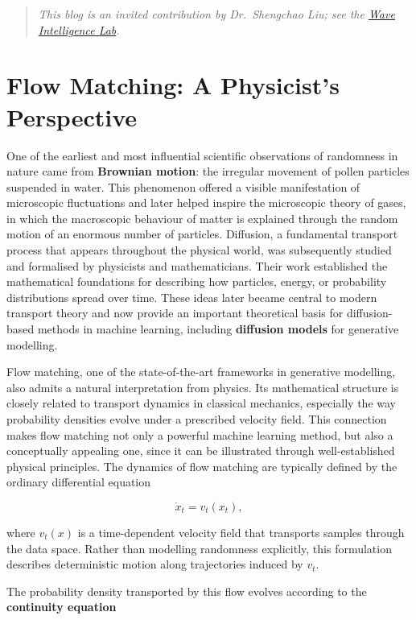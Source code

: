 \begin{quote}\emph{This blog is an invited contribution by Dr.~Shengchao Liu; see the \href{http://waveintell.ai/blog/}{Wave Intelligence Lab}.}\end{quote}

\section{Flow Matching: A Physicist's Perspective}

One of the earliest and most influential scientific observations of randomness in nature came from \textbf{Brownian motion}: the irregular movement of pollen particles suspended in water. This phenomenon offered a visible manifestation of microscopic fluctuations and later helped inspire the microscopic theory of gases, in which the macroscopic behaviour of matter is explained through the random motion of an enormous number of particles. Diffusion, a fundamental transport process that appears throughout the physical world, was subsequently studied and formalised by physicists and mathematicians. Their work established the mathematical foundations for describing how particles, energy, or probability distributions spread over time. These ideas later became central to modern transport theory and now provide an important theoretical basis for diffusion-based methods in machine learning, including \textbf{diffusion models} for generative modelling.

Flow matching, one of the state-of-the-art frameworks in generative modelling, also admits a natural interpretation from physics. Its mathematical structure is closely related to transport dynamics in classical mechanics, especially the way probability densities evolve under a prescribed velocity field. This connection makes flow matching not only a powerful machine learning method, but also a conceptually appealing one, since it can be illustrated through well-established physical principles. The dynamics of flow matching are typically defined by the ordinary differential equation

\[
\dot{x}_t = v_t(x_t),
\]

where \(v_t(x)\) is a time-dependent velocity field that transports samples through the data space. Rather than modelling randomness explicitly, this formulation describes deterministic motion along trajectories induced by \(v_t\).

The probability density transported by this flow evolves according to the \textbf{continuity equation}

